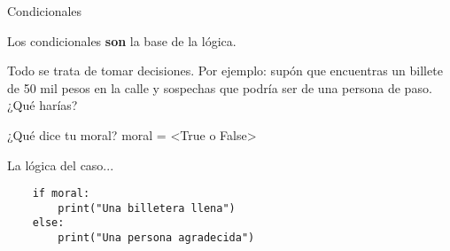 \begin{frame}[fragile]{Condicionales}\vspace{10pt}

Los condicionales \textbf{son} la base de la l\'ogica. 

\vspace{5pt}

\justifying

Todo se trata de tomar decisiones. Por ejemplo: sup\'on que encuentras un billete de 50 mil pesos en la calle y sospechas que podr\'ia ser de una persona de paso. ¿Qu\'e har\'ias?

\begin{block}{¿Qué dice tu moral?}
	moral = <True o False>
\end{block}

La lógica del caso...

\begin{center}
\begin{lstlisting}
	if moral:
		print("Una billetera llena") 
	else:
		print("Una persona agradecida")
\end{lstlisting}
\end{center}

\end{frame}